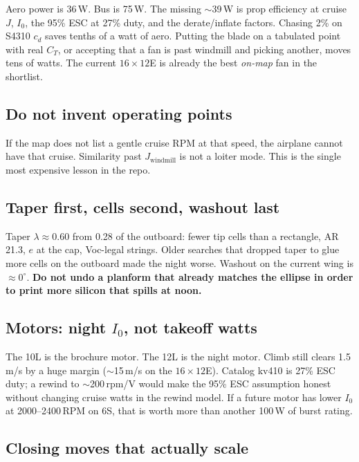\documentclass[11pt,letterpaper]{article}
\begin{document}
Aero power is 36\,W. Bus is 75\,W. The missing $\sim$39\,W is prop efficiency at cruise $J$, $I_0$, the 95\% ESC at 27\% duty, and the derate/inflate factors. Chasing 2\% on S4310 $c_d$ saves tenths of a watt of aero. Putting the blade on a tabulated point with real $C_T$, or accepting that a fan is past windmill and picking another, moves tens of watts. The current $16\times12$E is already the best \emph{on-map} fan in the shortlist.

\subsection{Do not invent operating points}

If the map does not list a gentle cruise RPM at that speed, the airplane cannot have that cruise. Similarity past $J_\mathrm{windmill}$ is not a loiter mode. This is the single most expensive lesson in the repo.

\subsection{Taper first, cells second, washout last}

Taper $\lambda\approx 0.60$ from 0.28 of the outboard: fewer tip cells than a rectangle, AR 21.3, $e$ at the cap, Voc-legal strings. Older searches that dropped taper to glue more cells on the outboard made the night worse. Washout on the current wing is $\approx 0^\circ$. \textbf{Do not undo a planform that already matches the ellipse in order to print more silicon that spills at noon.}

\subsection{Motors: night $I_0$, not takeoff watts}

The 10L is the brochure motor. The 12L is the night motor. Climb still clears 1.5\,m/s by a huge margin ($\sim$15\,m/s on the $16\times12$E). Catalog kv410 is 27\% ESC duty; a rewind to $\sim$200\,rpm/V would make the 95\% ESC assumption honest without changing cruise watts in the rewind model. If a future motor has lower $I_0$ at 2000--2400\,RPM on 6S, that is worth more than another 100\,W of burst rating.

\subsection{Closing moves that actually scale}
\end{document}
